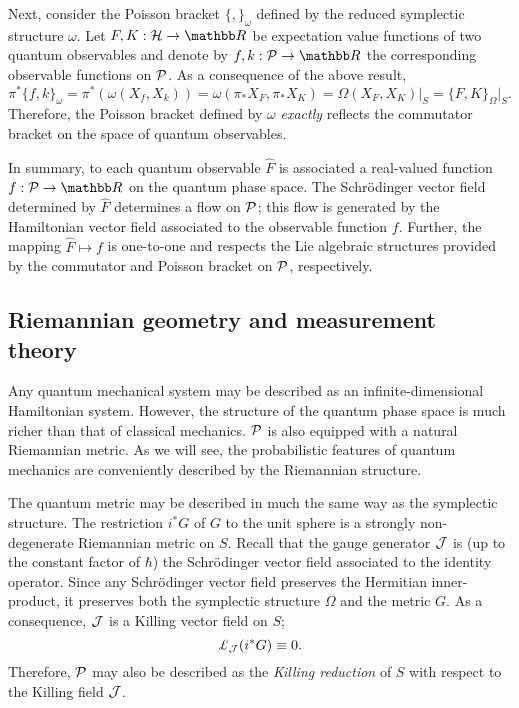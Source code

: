 \documentclass[12pt,aps,eqsecnum,tighten]{revtex4-2}
\def\be{\begin{equation}}
\def\ee{\end{equation}}
\def\H{{\cal H}}
\def\P{{\cal P}}
\def\w{\omega}
\def\W{\Omega}
\def\J{{\cal J}}
\newcommand{\lie}[1]{{\pounds}_{#1}}
\newcommand{\hvf}[1]{{X_{#1}}}
\def\R{\mathbb R}
\begin{document}
Next, consider the Poisson bracket $\{ , \}_\w$ defined by the reduced
symplectic structure $\w$.  Let $F, K :\H \rightarrow \R$ be
expectation value functions of two quantum observables and denote by
$f,k:\P \rightarrow \R$ the corresponding observable functions on
$\P$.  As a consequence of the above result,
%
\be \label{pb_on_P}
\pi^*\{ f, k \}_\w = \pi^*( \w( \hvf{f}, \hvf{k} ) )
= \w( \pi_*\hvf{F}, \pi_*\hvf{K} )
= \W( \hvf{F}, \hvf{K} )\big|_S
= \{ F, K \}_\W\big|_S.
\ee
%
Therefore, the Poisson bracket defined by $\w$ {\em exactly} reflects
the commutator bracket on the space of quantum observables.

In summary, to each quantum observable $\hat{F}$ is associated a
real-valued function $f:\P \rightarrow \R$ on the quantum phase space.
The Schr\"odinger vector field determined by $\hat{F}$ determines a
flow on $\P$; this flow is generated by the Hamiltonian vector field
associated to the observable function $f$.  Further, the mapping
$\hat{F} \mapsto f$ is one-to-one and respects the Lie algebraic
structures provided by the commutator and Poisson bracket on $\P$,
respectively.


\subsection{Riemannian geometry and measurement theory}
\label{sec2.C}

Any quantum mechanical system may be described as an
infinite-dimensional Hamiltonian system.  However, the structure of
the quantum phase space is much richer than that of classical
mechanics.  $\P$ is also equipped with a natural Riemannian metric.
As we will see, the probabilistic features of quantum mechanics are
conveniently described by the Riemannian structure.

The quantum metric may be described in much the same way as the
symplectic structure.  The restriction $i^*G$ of $G$ to the unit
sphere is a strongly non-degenerate Riemannian metric on $S$.  Recall
that the gauge generator $\J$ is (up to the constant factor of
$\hbar$) the Schr\"odinger vector field associated to the identity
operator.  Since any Schr\"odinger vector field preserves the
Hermitian inner-product, it preserves both the symplectic structure
$\W$ and the metric $G$.  As a consequence, $\J$ is a Killing vector
field on $S$;
%
\be
	\lie{\J} (i^*G) \equiv 0.
\ee
%
Therefore, $\P$ may also be described as the {\em Killing
reduction}\cite{geroch} of $S$ with respect to the Killing field $\J$.
\end{document}
